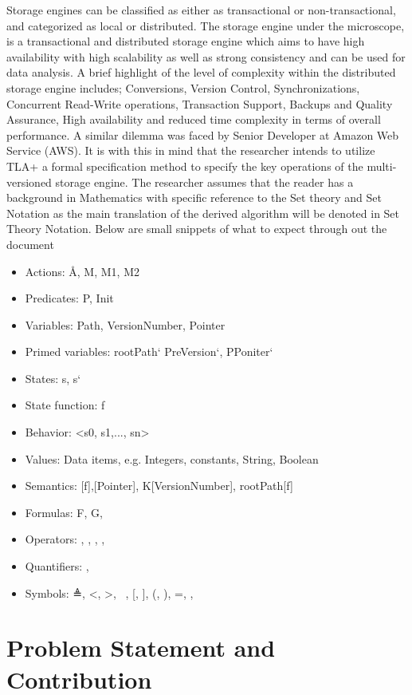 \documentclass[11pt,a4paper,oneside]{book} %
\numberwithin{equation}{section}
\begin{document}
Storage engines can be classified as
either as transactional or non-transactional, and categorized as local or distributed. The storage engine under the microscope, is a transactional and distributed storage engine which aims to have high availability with high scalability as well as strong consistency and can be used for data analysis. A brief highlight of the level of complexity within the distributed storage engine includes; Conversions, Version Control, Synchronizations, Concurrent Read-Write operations, Transaction Support, Backups and Quality Assurance, High availability and reduced time complexity in terms of overall performance. A similar dilemma was faced by Senior Developer
at Amazon Web Service (AWS). It is with this in mind that the researcher intends to utilize TLA+ a formal specification method to specify the key operations of the multi-versioned storage engine.
The researcher assumes that the reader has a background in Mathematics with specific reference to the Set theory and Set Notation as the main translation of the derived algorithm will be denoted in Set Theory Notation. Below are small snippets of what to expect through out the document
\begin{itemize}
\item Actions: Å, M, M1, M2
\item Predicates: P, Init\baro
\item Variables: Path, VersionNumber, Pointer
\item Primed variables: rootPath` PreVersion`, PPoniter`
\item States: s, s`
\item State function: f
\item Behavior: <s0, s1,..., sn>
\item Values: Data items, e.g. Integers, constants, String, Boolean
\item Semantics: [f],[Pointer], K[VersionNumber], rootPath[f]
\item Formulas: F, G, \textPhi
\item Operators: \Box, \diamond, \neq, \vee, \wedge
\item Quantifiers: \forall,\exists
\item Symbols:  ≜, <, >, ~, [, ], (, ), =, \equiv, \cdots

\end{itemize}

\section{Problem Statement and Contribution}
\end{document}
